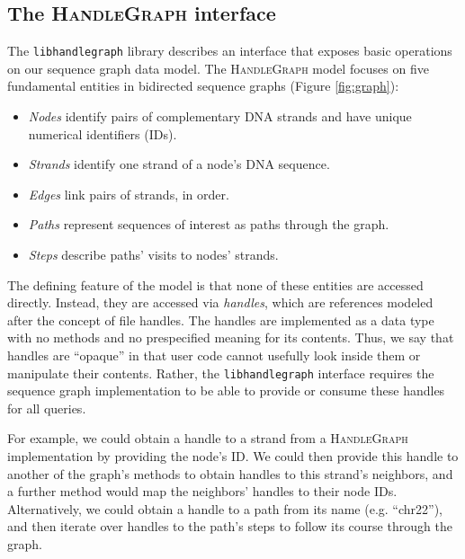 \documentclass{bioinfo}
\begin{document}
\begin{methods}
\subsection{The \textsc{HandleGraph} interface}

The \texttt{libhandlegraph} library describes an interface that exposes basic operations on our sequence graph data model.
The \textsc{HandleGraph} model focuses on five fundamental entities in bidirected sequence graphs (Figure \ref{fig:graph}):

\begin{itemize}
\item \emph{Nodes} identify pairs of complementary DNA strands and have unique numerical identifiers (IDs).
\item \emph{Strands} identify one strand of a node's DNA sequence.
\item \emph{Edges} link pairs of strands, in order.
\item \emph{Paths} represent sequences of interest as paths through the graph.
\item \emph{Steps} describe paths' visits to nodes' strands.
\end{itemize}

The defining feature of the model is that none of these entities are accessed directly.
Instead, they are accessed via \emph{handles}, which are references modeled after the concept of file handles.
The handles are implemented as a data type with no methods and no prespecified meaning for its contents.
Thus, we say that handles are ``opaque'' in that user code cannot usefully look inside them or manipulate their contents.
Rather, the \texttt{libhandlegraph} interface requires the sequence graph implementation to be able to provide or consume these handles for all queries.

For example, we could obtain a handle to a strand from a \textsc{HandleGraph} implementation by providing the node's ID.
We could then provide this handle to another of the graph's methods to obtain handles to this strand's neighbors, and a further method would map the neighbors' handles to their node IDs.
Alternatively, we could obtain a handle to a path from its name (e.g. ``chr22''), and then iterate over handles to the path's steps to follow its course through the graph.


\end{methods}
\end{document}
